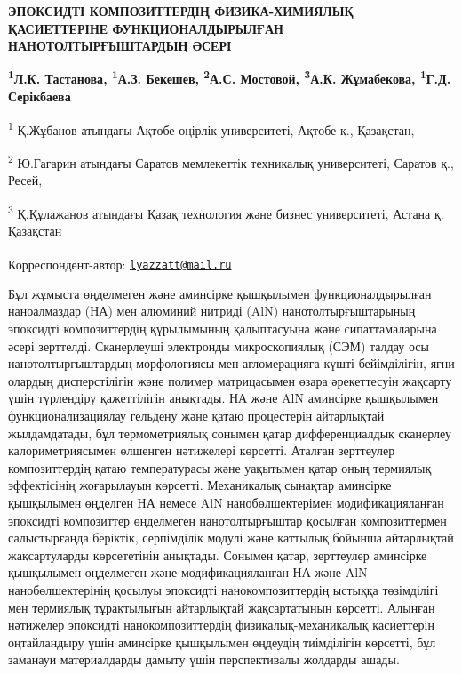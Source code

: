 
{\bfseries ЭПОКСИДТІ КОМПОЗИТТЕРДІҢ ФИЗИКА-ХИМИЯЛЫҚ ҚАСИЕТТЕРІНЕ
ФУНКЦИОНАЛДЫРЫЛҒАН НАНОТОЛТЫРҒЫШТАРДЫҢ ӘСЕРІ}

{\bfseries \textsuperscript{1}Л.К. Тастанова\textsuperscript{\envelope },
\textsuperscript{1}А.З. Бекешев, \textsuperscript{2}А.С. Мостовой,
\textsuperscript{3}А.К. Жұмабекова, \textsuperscript{1}Г.Д. Серікбаева}

\textsuperscript{1} Қ.Жұбанов атындағы Ақтөбе өңірлік университеті,
Ақтөбе қ., Қазақстан,

\textsuperscript{2} Ю.Гагарин атындағы Саратов мемлекеттік техникалық
университеті, Саратов қ., Ресей,

\textsuperscript{3} Қ.Құлажанов атындағы Қазақ технология және бизнес
университеті, Астана қ. Қазақстан

{\bfseries \textsuperscript{\envelope }}Корреспондент-автор:
\href{mailto:lyazzatt@mail.ru}{\nolinkurl{lyazzatt@mail.ru}}

Бұл жұмыста өңделмеген және аминсірке қышқылымен функционалдырылған
наноалмаздар (НА) мен алюминий нитриді (AlN) нанотолтырғыштарының
эпоксидті композиттердің құрылымының қалыптасуына және сипаттамаларына
әсері зерттелді. Сканерлеуші электронды микроскопиялық (СЭМ) талдау осы
нанотолтырғыштардың морфологиясы мен агломерацияға күшті бейімділігін,
яғни олардың дисперстілігін және полимер матрицасымен өзара әрекеттесуін
жақсарту үшін түрлендіру қажеттілігін анықтады. НА және AlN аминсірке
қышқылымен функционализациялау гельдену және қатаю процестерін
айтарлықтай жылдамдатады, бұл термометриялық сонымен қатар
дифференциалдық сканерлеу калориметриясымен өлшенген нәтижелері
көрсетті. Аталған зерттеулер композиттердің қатаю температурасы және
уақытымен қатар оның термиялық эффектісінің жоғарылауын көрсетті.
Механикалық сынақтар аминсірке қышқылымен өңделген НА немесе AlN
нанобөлшектерімен модификацияланған эпоксидті композиттер өңделмеген
нанотолтырғыштар қосылған композиттермен салыстырғанда беріктік,
серпімділік модулі және қаттылық бойынша айтарлықтай жақсартуларды
көрсететінін анықтады. Сонымен қатар, зерттеулер аминсірке қышқылымен
өңделмеген және модификацияланған НА және AlN нанобөлшектерінің қосылуы
эпоксидті нанокомпозиттердің ыстыққа төзімділігі мен термиялық
тұрақтылығын айтарлықтай жақсартатынын көрсетті. Алынған нәтижелер
эпоксидті нанокомпозиттердің физикалық-механикалық қасиеттерін
оңтайландыру үшін аминсірке қышқылымен өңдеудің тиімділігін көрсетті,
бұл заманауи материалдарды дамыту үшін перспективалы жолдарды ашады.

